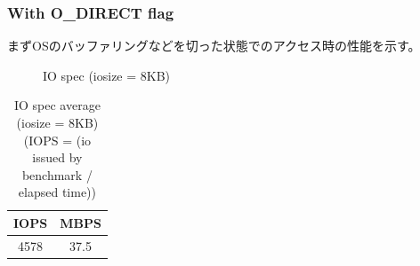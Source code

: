 \documentclass[11pt,a4paper]{jsarticle}
\newlength{\subfigwidth}
\newlength{\subfigcolsep}
\begin{document}
\subsubsection{With O\_DIRECT flag}
まずOSのバッファリングなどを切った状態でのアクセス時の性能を示す。
\begin{figure}[thbp]
 \setlength{\subfigwidth}{.5\linewidth}
 \addtolength{\subfigwidth}{-.5\subfigcolsep}
 \begin{minipage}[b]{\subfigwidth}
 \end{minipage}
  \begin{minipage}[b]{\subfigwidth}
  \end{minipage}
  \caption{IO spec (iosize = 8KB)}
  \label{fig:rand8192wod}
\end{figure}

\begin{table}[htbp]
 \begin{center}
  \caption{IO spec average (iosize = 8KB) \newline
  (IOPS = (io issued by benchmark / elapsed time))}
  \label{tbl:rand8192wod}
 \begin{tabular}{cc} \hline
  IOPS & MBPS \\ \hline
  4578 & 37.5 \\ \hline
 \end{tabular}
 \end{center}
\end{table}
\end{document}
